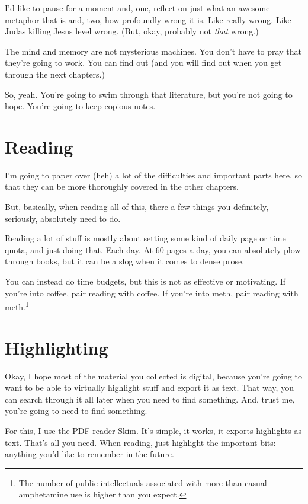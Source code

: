 I'd like to pause for a moment and, one, reflect on just what an awesome
metaphor that is and, two, how profoundly wrong it is. Like really wrong. Like Judas
killing Jesus level wrong. (But, okay, probably not \textit{that} wrong.)

The mind and memory
are not mysterious machines. You don't have to pray that they're going to
work. You can find out (and you will find out when you get through the next chapters.)

So, yeah. You're going to swim through that literature, but you're not going to
hope. You're going to keep copious notes.

\section{Reading}

I'm going to paper over (heh) a lot of the difficulties and important parts
here, so that they can be more thoroughly covered in the other chapters.

But, basically, when reading all of this, there a few things you definitely,
seriously, absolutely need to do.

Reading a lot of stuff is mostly about setting some kind of daily page or time
quota, and just doing that. Each day. At 60 pages a day, you can absolutely plow
through books, but it can be a slog when it comes to dense prose.

You can instead do time budgets, but this is not as effective or motivating. If
you're into coffee, pair reading with coffee. If you're into meth, pair reading with meth.\footnote{The number of public intellectuals associated with more-than-casual amphetamine use is higher than you expect.}

\section{Highlighting}

Okay, I hope most of the material you collected is digital, because you're
going to want to be able to virtually highlight stuff and export it as
text. That way, you can search through it all later when you need to find
something. And, trust me, you're going to need to find something.

For this, I use the PDF reader \href{http://skim-app.sourceforge.net/}{Skim}. It's simple, it works, it exports
highlights as text. That's all you need. When reading, just
highlight the important bits: anything you'd like to remember in the future.

